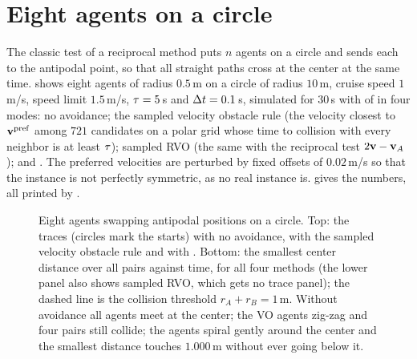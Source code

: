 \section{Eight agents on a circle}
\label{sec:ch13-simulation}

The classic test of a reciprocal method puts $n$ agents on a circle and
sends each to the antipodal point, so that all straight paths cross at the
center at the same time.  shows eight agents of radius
$0.5$\,m on a circle of radius $10$\,m, cruise speed $1$\,m/s, speed limit
$1.5$\,m/s, $\tau = 5$\,s and $\Delta t = 0.1$\,s, simulated for $30$\,s with
 of  in four modes: no avoidance;
the sampled velocity obstacle rule (the velocity closest to
$\mathbf{v}^{\mathrm{pref}}$ among $721$ candidates on a polar grid whose time to
collision with every neighbor is at least $\tau$); sampled RVO (the same
with the reciprocal test $2\mathbf{v} - \mathbf{v}_A$); and \orca. The preferred
velocities are perturbed by fixed offsets of $0.02$\,m/s so that the
instance is not perfectly symmetric, as no real instance is.
 gives the numbers, all printed by
.

\begin{figure}[tb]
  \centering
  \caption{Eight agents swapping antipodal positions on a circle. Top: the
  traces (circles mark the starts) with no avoidance, with the sampled
  velocity obstacle rule and with \orca. Bottom: the smallest center
  distance over all pairs against time, for all four methods (the lower panel
  also shows sampled RVO, which gets no trace panel); the dashed line is the collision
  threshold $r_A + r_B = 1$\,m. Without avoidance all agents meet at the
  center; the VO agents zig-zag and four pairs still collide; the \orca
  agents spiral gently around the center and the smallest distance touches
  $1.000$\,m without ever going below it.}
  \label{fig:ch13-circle}
\end{figure}

